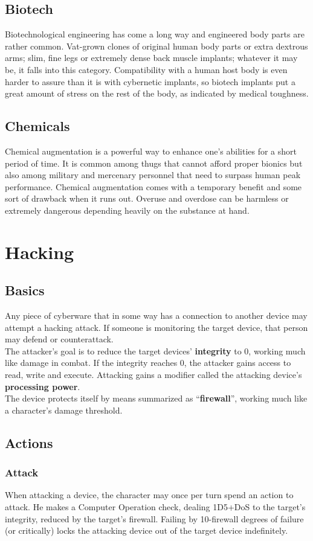 \documentclass[12pt,a4paper,openany]{book}
\begin{document}
	\section{Biotech}
	Biotechnological engineering has come a long way and engineered body parts are rather common. Vat-grown clones of original human body parts or extra dextrous arms; slim, fine legs or extremely dense back muscle implants; whatever it may be, it falls into this category.
	Compatibility with a human host body is even harder to assure than it is with cybernetic implants, so biotech implants put a great amount of stress on the rest of the body, as indicated by medical toughness.
	\section{Chemicals}
	Chemical augmentation is a powerful way to enhance one’s abilities for a short period of time. It is common among thugs that cannot afford proper bionics but also among military and mercenary personnel that need to surpass human peak performance. Chemical augmentation comes with a temporary benefit and some sort of drawback when it runs out. Overuse and overdose can be harmless or extremely dangerous depending heavily on the substance at hand.
	
	\chapter{Hacking}
	\section{Basics}
	Any piece of cyberware that in some way has a connection to another device may attempt a hacking attack. If someone is monitoring the target device, that person may defend or counterattack.\\
	The attacker’s goal is to reduce the target devices’ \textbf{integrity} to 0, working much like damage in combat. If the integrity reaches 0, the attacker gains access to read, write and execute. Attacking gains a modifier called the attacking device’s \textbf{processing power}.\\
	The device protects itself by means summarized as “\textbf{firewall}”, working much like a character’s damage threshold.
	\section{Actions}
	\subsection*{Attack}
	When attacking a device, the character may once per turn spend an action to attack. He makes a Computer Operation check, dealing 1D5+DoS to the target’s integrity, reduced by the target’s firewall. Failing by 10-firewall degrees of failure (or critically) locks the attacking device out of the target device indefinitely.
\end{document}
